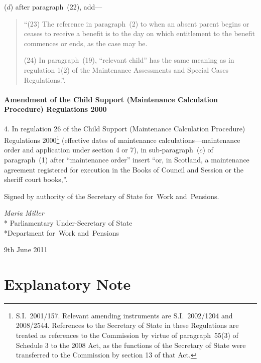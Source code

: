 \documentclass[12pt,a4paper]{article}
\begin{document}
\begin{enumerate}
($d$) after paragraph~(22), add—
\begin{quotation}
“(23) The reference in paragraph~(2) to when an absent parent begins or ceases to receive a benefit is to the day on which entitlement to the benefit commences or ends, as the case may be.

(24) In paragraph~(19), “relevant child” has the same meaning as in regulation 1(2) of the Maintenance Assessments and Special Cases Regulations.”.
\end{quotation}
\end{enumerate}

\subsection[4. Amendment of the Child Support (Maintenance Calculation Procedure) Regulations 2000]{Amendment of the Child Support (Maintenance Calculation Procedure) Regulations 2000}

4.  In regulation 26 of the Child Support (Maintenance Calculation Procedure) Regulations 2000\footnote{S.I.~2001/157. Relevant amending instruments are S.I.~2002/1204 and 2008/2544. References to the Secretary of State in these Regulations are treated as references to the Commission by virtue of paragraph~55(3) of Schedule 3 to the 2008 Act, as the functions of the Secretary of State were transferred to the Commission by section 13 of that Act.} (effective dates of maintenance calculations—maintenance order and application under section 4 or 7), in sub-paragraph~($c$)  of paragraph~(1) after “maintenance order” insert “or, in Scotland, a maintenance agreement registered for execution in the Books of Council and Session or the sheriff court books,”. 

\bigskip

\pagebreak[3]

Signed 
by authority of the 
Secretary of State for~Work and~Pensions.

{\raggedleft
\emph{Maria Miller}\\*
Parliamentary Under-Secretary 
of State\\*Department 
for~Work and~Pensions

}

9th June 2011

\small

\part{Explanatory Note}
\end{document}
